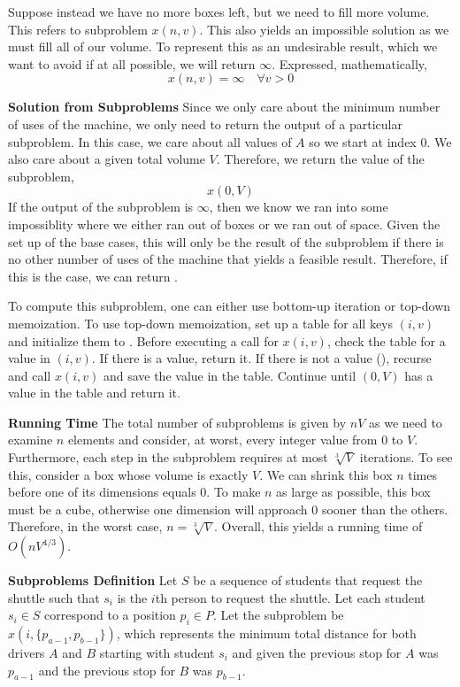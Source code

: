 \documentclass[12pt,twoside]{article}
\begin{document}
\begin{problems}
Suppose instead we have no more boxes left, but we need to fill more volume.
This refers to subproblem $x(n, v)$. This also yields an impossible solution
as we must fill all of our volume. To represent this as an undesirable
result, which we want to avoid if at all possible, we will return $\infty$.
Expressed, mathematically,
$$ x(n, v) = \infty\quad \forall v > 0 $$

{\bf Solution from Subproblems} Since we only care about the minimum number
of uses of the machine, we only need to return the output of a particular
subproblem. In this case, we care about all values of $A$ so we start at
index $0$. We also care about a given total volume $V$. Therefore, we return
the value of the subproblem,
$$ x(0, V) $$
If the output of the subproblem is $\infty$, then we know we ran into some
impossiblity where we either ran out of boxes or we ran out of space. Given
the set up of the base cases, this will only be the result of the subproblem
if there is no other number of uses of the machine that yields a feasible
result. Therefore, if this is the case, we can return .

To compute this subproblem, one can either use bottom-up iteration or
top-down memoization. To use top-down memoization, set up a table for all
keys $(i, v)$ and initialize them to . Before executing a call
for $x(i, v)$, check the table for a value in $(i, v)$. If there is a value,
return it. If there is not a value (), recurse and call $x(i,
v)$ and save the value in the table. Continue until $(0, V)$ has a value in
the table and return it.

{\bf Running Time} The total number of subproblems is given by $n V$ as we
need to examine $n$ elements and consider, at worst, every integer value from
$0$ to $V$. Furthermore, each step in the subproblem requires at most
$\sqrt[3]{V}$ iterations. To see this, consider a box whose volume is exactly
$V$. We can shrink this box $n$ times before one of its dimensions equals
$0$. To make $n$ as large as possible, this box must be a cube, otherwise one
dimension will approach $0$ sooner than the others. Therefore, in the worst
case, $n = \sqrt[3]{V}$. Overall, this yields a running time of $O(n
V^{4/3})$.

\newpage
\problem  %

{\bf Subproblems Definition} Let $S$ be a sequence of students that request
the shuttle such that $s_i$ is the $i$th person to request the shuttle. Let
each student $s_i \in S$ correspond to a position $p_i \in P$. Let the
subproblem be $x(i, \{p_{a-1}, p_{b-1}\})$, which represents the minimum
total distance for both drivers $A$ and $B$ starting with student $s_i$ and
given the previous stop for $A$ was $p_{a-1}$ and the previous stop for $B$
was $p_{b-1}$.


\end{problems}
\end{document}
